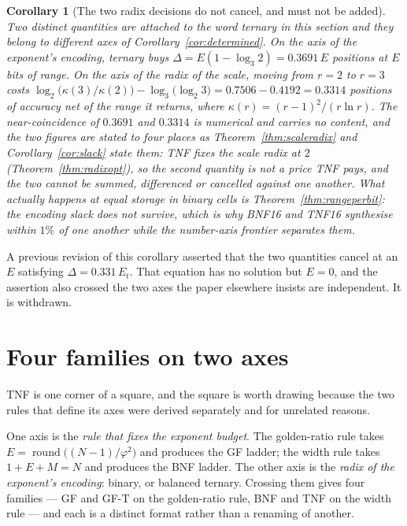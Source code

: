 \documentclass[11pt]{article}
\newtheorem{corollary}{Corollary}
\theoremstyle{definition}
\begin{document}
\begin{corollary}[The two radix decisions do not cancel, and must not be added]
\label{cor:worth}
Two distinct quantities are attached to the word \emph{ternary} in this section and
they belong to different axes of Corollary~\ref{cor:determined}. On the axis of the
\emph{exponent's encoding}, ternary buys $\Delta = E(1-\log_3 2) = 0.3691\,E$
positions at $E$ bits of range. On the axis of the \emph{radix of the scale},
moving from $r{=}2$ to $r{=}3$ costs $\log_2\bigl(\kappa(3)/\kappa(2)\bigr) -
\log_3\bigl(\log_2 3\bigr) = 0.7506 - 0.4192 = 0.3314$ positions of accuracy net
of the range it returns, where
$\kappa(r) = (r-1)^2/(r \ln r)$. The near-coincidence of $0.3691$ and $0.3314$ is
numerical and carries no content, and the two figures are stated to four places as
Theorem~\ref{thm:scaleradix} and Corollary~\ref{cor:slack} state them: TNF fixes the scale radix at $2$
(Theorem~\ref{thm:radixopt}), so the second quantity is not a price TNF pays, and
the two cannot be summed, differenced or cancelled against one another. What
actually happens at equal storage in binary cells is
Theorem~\ref{thm:rangeperbit}: the encoding slack does not survive, which is why
BNF16 and TNF16 synthesise within $1\%$ of one another while the number-axis
frontier separates them.
\end{corollary}

A previous revision of this corollary asserted that the two quantities cancel at
an $E$ satisfying $\Delta = 0.331\,E_t$. That equation has no solution but
$E = 0$, and the assertion also crossed the two axes the paper elsewhere insists
are independent. It is withdrawn.


\section{Four families on two axes}\label{sec:fourfamilies}

TNF is one corner of a square, and the square is worth drawing because the two
rules that define its axes were derived separately and for unrelated reasons.

One axis is the \emph{rule that fixes the exponent budget}. The golden-ratio
rule takes $E=\operatorname{round}\!\bigl((N-1)/\varphi^{2}\bigr)$ and produces
the GF ladder; the width rule takes $1+E+M=N$ and produces the BNF ladder. The
other axis is the \emph{radix of the exponent's encoding}: binary, or balanced
ternary. Crossing them gives four families --- GF and GF-T on the golden-ratio
rule, BNF and TNF on the width rule --- and each is a distinct format rather
than a renaming of another.
\end{document}
